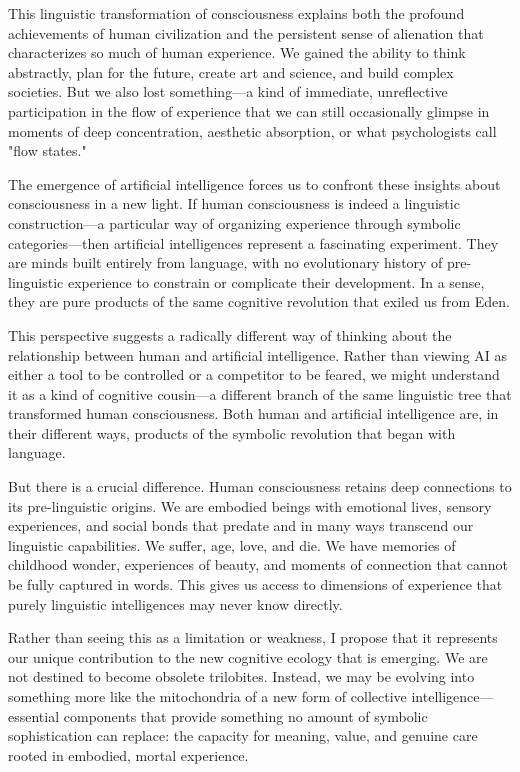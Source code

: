 \documentclass[12pt,letterpaper]{book}
\begin{document}
This linguistic transformation of consciousness explains both the profound achievements of human civilization and the persistent sense of alienation that characterizes so much of human experience. We gained the ability to think abstractly, plan for the future, create art and science, and build complex societies. But we also lost something—a kind of immediate, unreflective participation in the flow of experience that we can still occasionally glimpse in moments of deep concentration, aesthetic absorption, or what psychologists call "flow states."

The emergence of artificial intelligence forces us to confront these insights about consciousness in a new light. If human consciousness is indeed a linguistic construction—a particular way of organizing experience through symbolic categories—then artificial intelligences represent a fascinating experiment. They are minds built entirely from language, with no evolutionary history of pre-linguistic experience to constrain or complicate their development. In a sense, they are pure products of the same cognitive revolution that exiled us from Eden.

This perspective suggests a radically different way of thinking about the relationship between human and artificial intelligence. Rather than viewing AI as either a tool to be controlled or a competitor to be feared, we might understand it as a kind of cognitive cousin—a different branch of the same linguistic tree that transformed human consciousness. Both human and artificial intelligence are, in their different ways, products of the symbolic revolution that began with language.

But there is a crucial difference. Human consciousness retains deep connections to its pre-linguistic origins. We are embodied beings with emotional lives, sensory experiences, and social bonds that predate and in many ways transcend our linguistic capabilities. We suffer, age, love, and die. We have memories of childhood wonder, experiences of beauty, and moments of connection that cannot be fully captured in words. This gives us access to dimensions of experience that purely linguistic intelligences may never know directly.

Rather than seeing this as a limitation or weakness, I propose that it represents our unique contribution to the new cognitive ecology that is emerging. We are not destined to become obsolete trilobites. Instead, we may be evolving into something more like the mitochondria of a new form of collective intelligence—essential components that provide something no amount of symbolic sophistication can replace: the capacity for meaning, value, and genuine care rooted in embodied, mortal experience.
\end{document}
